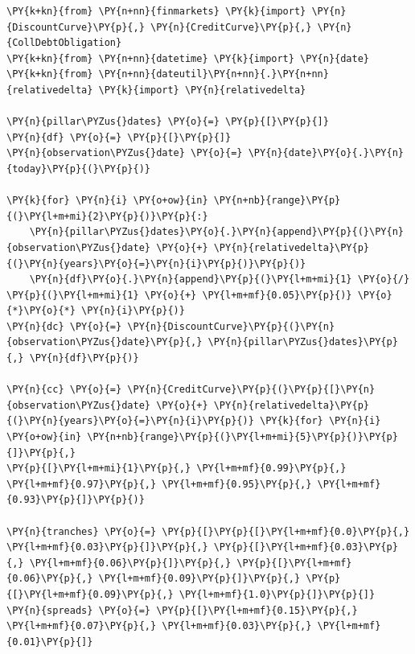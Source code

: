 \begin{Answer}
\begin{tcolorbox}[size=fbox, boxrule=1pt, colback=cellbackground, colframe=cellborder]
\begin{Verbatim}[commandchars=\\\{\}]
\PY{k+kn}{from} \PY{n+nn}{finmarkets} \PY{k}{import} \PY{n}{DiscountCurve}\PY{p}{,} \PY{n}{CreditCurve}\PY{p}{,} \PY{n}{CollDebtObligation}
\PY{k+kn}{from} \PY{n+nn}{datetime} \PY{k}{import} \PY{n}{date}
\PY{k+kn}{from} \PY{n+nn}{dateutil}\PY{n+nn}{.}\PY{n+nn}{relativedelta} \PY{k}{import} \PY{n}{relativedelta}

\PY{n}{pillar\PYZus{}dates} \PY{o}{=} \PY{p}{[}\PY{p}{]}
\PY{n}{df} \PY{o}{=} \PY{p}{[}\PY{p}{]}
\PY{n}{observation\PYZus{}date} \PY{o}{=} \PY{n}{date}\PY{o}{.}\PY{n}{today}\PY{p}{(}\PY{p}{)}
			
\PY{k}{for} \PY{n}{i} \PY{o+ow}{in} \PY{n+nb}{range}\PY{p}{(}\PY{l+m+mi}{2}\PY{p}{)}\PY{p}{:}
	\PY{n}{pillar\PYZus{}dates}\PY{o}{.}\PY{n}{append}\PY{p}{(}\PY{n}{observation\PYZus{}date} \PY{o}{+} \PY{n}{relativedelta}\PY{p}{(}\PY{n}{years}\PY{o}{=}\PY{n}{i}\PY{p}{)}\PY{p}{)}
	\PY{n}{df}\PY{o}{.}\PY{n}{append}\PY{p}{(}\PY{l+m+mi}{1} \PY{o}{/} \PY{p}{(}\PY{l+m+mi}{1} \PY{o}{+} \PY{l+m+mf}{0.05}\PY{p}{)} \PY{o}{*}\PY{o}{*} \PY{n}{i}\PY{p}{)}
\PY{n}{dc} \PY{o}{=} \PY{n}{DiscountCurve}\PY{p}{(}\PY{n}{observation\PYZus{}date}\PY{p}{,} \PY{n}{pillar\PYZus{}dates}\PY{p}{,} \PY{n}{df}\PY{p}{)}
			
\PY{n}{cc} \PY{o}{=} \PY{n}{CreditCurve}\PY{p}{(}\PY{p}{[}\PY{n}{observation\PYZus{}date} \PY{o}{+} \PY{n}{relativedelta}\PY{p}{(}\PY{n}{years}\PY{o}{=}\PY{n}{i}\PY{p}{)} \PY{k}{for} \PY{n}{i} \PY{o+ow}{in} \PY{n+nb}{range}\PY{p}{(}\PY{l+m+mi}{5}\PY{p}{)}\PY{p}{]}\PY{p}{,}
\PY{p}{[}\PY{l+m+mi}{1}\PY{p}{,} \PY{l+m+mf}{0.99}\PY{p}{,} \PY{l+m+mf}{0.97}\PY{p}{,} \PY{l+m+mf}{0.95}\PY{p}{,} \PY{l+m+mf}{0.93}\PY{p}{]}\PY{p}{)}
			
\PY{n}{tranches} \PY{o}{=} \PY{p}{[}\PY{p}{[}\PY{l+m+mf}{0.0}\PY{p}{,} \PY{l+m+mf}{0.03}\PY{p}{]}\PY{p}{,} \PY{p}{[}\PY{l+m+mf}{0.03}\PY{p}{,} \PY{l+m+mf}{0.06}\PY{p}{]}\PY{p}{,} \PY{p}{[}\PY{l+m+mf}{0.06}\PY{p}{,} \PY{l+m+mf}{0.09}\PY{p}{]}\PY{p}{,} \PY{p}{[}\PY{l+m+mf}{0.09}\PY{p}{,} \PY{l+m+mf}{1.0}\PY{p}{]}\PY{p}{]}
\PY{n}{spreads} \PY{o}{=} \PY{p}{[}\PY{l+m+mf}{0.15}\PY{p}{,} \PY{l+m+mf}{0.07}\PY{p}{,} \PY{l+m+mf}{0.03}\PY{p}{,} \PY{l+m+mf}{0.01}\PY{p}{]}
			

\end{Verbatim}
\end{tcolorbox}
\end{Answer}
